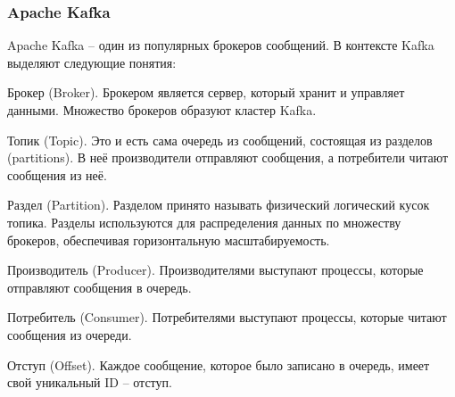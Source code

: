 %
%

\subsubsection{Apache Kafka}\label{subsubsec:domain:apache-kafka}
Apache Kafka -- один из популярных брокеров сообщений.
В контексте Kafka выделяют следующие понятия:
\begin{enumerate_num}
    \item Брокер (Broker).
    Брокером является сервер, который хранит и управляет данными.
    Множество брокеров образуют кластер Kafka.
    \item Топик (Topic).
    Это и есть сама очередь из сообщений, состоящая из разделов (partitions).
    В неё производители отправляют сообщения, а потребители читают сообщения из неё.
    \item Раздел (Partition).
    Разделом принято называть физический логический кусок топика.
    Разделы используются для распределения данных по множеству брокеров, обеспечивая горизонтальную масштабируемость.
    \item Производитель (Producer).
    Производителями выступают процессы, которые отправляют сообщения в очередь.
    \item Потребитель (Consumer).
    Потребителями выступают процессы, которые читают сообщения из очереди.
    \item Отступ (Offset).
    Каждое сообщение, которое было записано в очередь, имеет свой уникальный ID -- отступ.
\end{enumerate_num}


